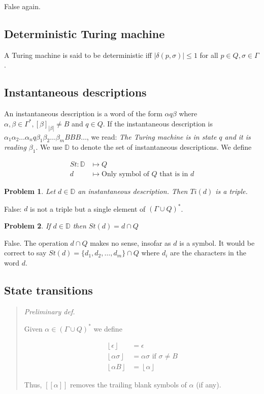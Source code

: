 \documentclass[a4paper, 12pt]{article}
\newtheorem{problem}{Problem}
\newtheorem{problem}{Problem}
\begin{document}
False again.

\subsection{Deterministic Turing machine}

A Turing machine is said to be deterministic iff $|\delta(p, \sigma)| \leq 1$
for all $p \in Q, \sigma \in \Gamma$. 

\subsection{Instantaneous descriptions}

An instantaneous description is a word of the form $\alpha q \beta $ where
$\alpha, \beta \in \Gamma^{*}, [\beta]_{|\beta |} \neq B$ and $q \in Q$. If the
instantaneous description is $\alpha_1 \alpha_2 \ldots \alpha_n q \beta_1
\beta_2 \ldots \beta_m B B B \ldots$, we read: \textit{The Turing
machine is in state $q$ and it is reading $\beta_1$}. We use $\mathbb{D}$ to
denote the set of instantaneous descriptions. We define 

\begin{align*}
    St : \mathbb{D} &\mapsto  Q \\ 
    d &\mapsto \text{Only symbol of $Q$ that is in $d$}
\end{align*}

\begin{problem}
    Let $d \in \mathbb{D}$ an instantaneous description. Then $Ti(d)$ is a
    triple.
\end{problem}

False: $d$ is not a triple but a single element of $(\Gamma \cup Q)^{*}$.

\begin{problem}
    If $d \in \mathbb{D}$ then $St(d) = d \cap Q$
\end{problem}

False. The operation $d \cap Q$ makes no sense, insofar as $d$ is a symbol. It
would be correct to say $St(d) = \{d_1, d_2, \ldots, d_m\} \cap Q$ where $d_i$ are
the characters in the word $d$.

\subsection{State transitions}

\small
\begin{quote}
\textit{Preliminary def. }

Given $\alpha \in (\Gamma \cup Q)^*$ we define 

\begin{align*}
    \left\lfloor \epsilon \right\rfloor  &= \epsilon \\ 
    \left\lfloor \alpha \sigma  \right\rfloor  &= \alpha \sigma \text{   if } \sigma \neq B \\ 
    \left\lfloor \alpha B \right\rfloor &= \left\lfloor  \alpha \right\rfloor
\end{align*}

Thus, $[[ \alpha ]]$ removes the trailing blank symbols of $\alpha$ (if any).
\end{quote}
\normalsize 
\end{document}
